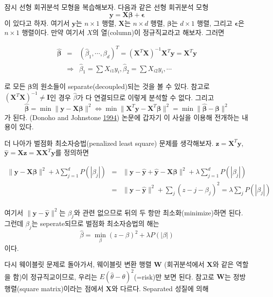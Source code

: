 \documentclass[b5paper,]{book}
\theoremstyle{definition}
\theoremstyle{definition}
\theoremstyle{definition}
\theoremstyle{remark}
\begin{document}
잠시 선형 회귀분석 모형을 복습해보자. 다음과 같은 선형 회귀분석 모형
\[\mathbf{y}=\mathbf{X}\boldsymbol{\beta}+\boldsymbol{\epsilon}\] 이
있다고 하자. 여기서 \(\mathbf{y}\)는 \(n \times 1\) 행렬,
\(\mathbf{X}\)는 \(n \times d\) 행렬, \(\boldsymbol{\beta}\)는
\(d \times 1\) 행렬, 그리고 \(\boldsymbol{\epsilon}\)은 \(n \times 1\)
행렬이다. 만약 여기서 \(X\)의 열(column)이 정규직교라고 해보자. 그러면

\begin{eqnarray*}
\hat{\boldsymbol{\beta}}&=&(\hat{\beta}_{1},\cdots,\beta_{d})^{T}=(\mathbf{X}^{T}\mathbf{X})^{-1}\mathbf{X}^{T}\mathbf{y}=\mathbf{X}^{T}\mathbf{y}\\
&\Longrightarrow& \hat{\beta}_{1}=\sum X_{i1}y_{i}, \hat{\beta}_{2}=\sum X_{i2}y_{i}, \cdots
\end{eqnarray*}

로 모든 \(\boldsymbol{\beta}\)의 원소들이 separate(decoupled)되는 것을
볼 수 있다. 참고로 \((\mathbf{X}^{T}\mathbf{X})^{-1}\neq \mathbf{I}\)인
경우 \(\hat{\beta}\)가 다 연결되므로 이렇게 분석할 수 없다. 그리고
\[\hat{\boldsymbol{\beta}}=\min \| \mathbf{y}-\mathbf{X}\boldsymbol{\beta} \|^{2} \Leftrightarrow \min \| \mathbf{X}^{T}\mathbf{y} - \mathbf{X}^{T}\boldsymbol{\beta} \|^{2}=\min \| \hat{\boldsymbol{\beta}}-\boldsymbol{\beta} \|^{2}\]
가 된다. (Donoho and Johnstone \protect\hyperlink{ref-Donoho1994}{1994})
논문에 갑자기 이 사실을 이용해 전개하는 내용이 있다.

더 나아가 벌점화 최소자승법(penalized least square) 문제를 생각해보자.
\(\mathbf{z}=\mathbf{X}^{T}\mathbf{y}\),
\(\hat{\mathbf{y}}=\mathbf{Xz}=\mathbf{XX}^{T}\mathbf{y}\)를 정의하면

\begin{eqnarray*}
\| \mathbf{y}-\mathbf{X}\boldsymbol{\beta}\|^{2}+\lambda \sum_{j=1}^{d}P(| \beta_{j} |) &=& \| \mathbf{y}-\hat{\mathbf{y}}+\hat{\mathbf{y}}-\mathbf{X}\boldsymbol{\beta}\|^{2}+\lambda \sum_{j=1}^{d}P(|\beta_{j}|)\\
&=&\| \mathbf{y} -\hat{\mathbf{y}} \|^{2} + \sum_{j}(z-{j}-\beta_{j})^{2}=\lambda\sum_{j}P(|\beta_{j}|)\\
\end{eqnarray*}

여기서 \(\| \mathbf{y} -\hat{\mathbf{y}} \|^{2}\)는 \(\beta_{j}\)와 관련
없으므로 뒤의 두 항만 최소화(minimize)하면 된다. 그런데 \(\beta_{j}\)는
seperate되므로 벌점화 최소자승법의 해는
\[\hat{\beta}=\min_{\beta}(z-\beta)^{2}+\lambda P(| \beta |)\] 이다.

다시 웨이블릿 문제로 돌아가서, 웨이블릿 변환 행렬 \(\mathbf{W}\)
(회귀분석에서 \(\mathbf{X}\)와 같은 역할을 함)이 정규직교이므로, 우리는
\(E(\hat{\theta}-\theta)^{2}\)(=risk)만 보면 된다. 참고로
\(\mathbf{W}\)는 정방행렬(square matrix)이라는 점에서 \(\mathbf{X}\)와
다르다. Separated 성질에 의해
\end{document}
